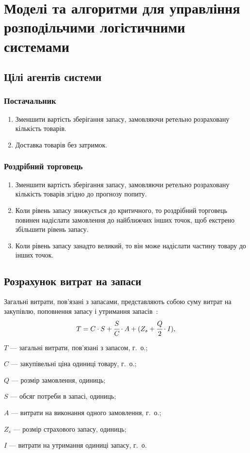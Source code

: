 \section{Моделі та алгоритми для управління розподільчими логістичними системами}
\subsection{Цілі агентів системи}
\subsubsection{Постачальник}
\begin{enumerate}
	\item Зменшити вартість зберігання запасу, замовляючи ретельно розраховану кількість товарів.
	\item Доставка товарів без затримок.
\end{enumerate}

\subsubsection{Роздрібний торговець}
\begin{enumerate}
	\item Зменшити вартість зберігання запасу, замовляючи ретельно розраховану кількість товарів згідно до прогнозу попиту.
	\item Коли рівень запасу знижується до критичного, то роздрібний торговець повинен надіслати замовлення до найближчих інших точок, щоб екстрено збільшити рівень запасу.
	\item Коли рівень запасу занадто великий, то він може надіслати частину товару до інших точок.
\end{enumerate}

\subsection{Розрахунок витрат на запаси}
Загальні витрати, пов'язані з запасами, представляють собою суму витрат на закупівлю, поповнення запасу і утримання запасів~\cite{Sterligova2008}:
\begin{equation} \label{eq:t}
T=C\cdot S+\cfrac{S}{C}\cdot A+(Z_s+\cfrac{Q}{2}\cdot I)
,
\end{equation}
\begin{description}
	\item[де] $T$ --- загальні витрати, пов'язані з запасом, г.~о.;
	\item $C$ --- закупівельні ціна одиниці товару, г.~о.;
	\item $Q$ --- розмір замовлення, одиниць;
	\item $S$ --- обсяг потреби в запасі, одиниць;
	\item $A$ --- витрати на виконання одного замовлення, г.~о.;
	\item $Z_s$ --- розмір страхового запасу, одиниць;
	\item $I$ --- витрати на утримання одиниці запасу, г.~о.
\end{description}

